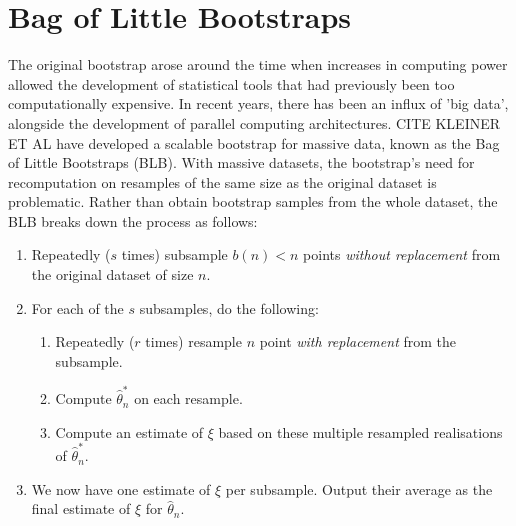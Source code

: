 \documentclass{article}\usepackage[]{graphicx}\usepackage[]{color}
\begin{document}


\section{Bag of Little Bootstraps}
The original bootstrap arose around the time when increases in computing power allowed the development of statistical tools that had previously been too computationally expensive. In recent years, there has been an influx of 'big data', alongside the development of parallel computing architectures. CITE KLEINER ET AL have developed a scalable bootstrap for massive data, known as the Bag of Little Bootstraps (BLB). With massive datasets, the bootstrap's need for recomputation on resamples of the same size as the original dataset is problematic. Rather than obtain bootstrap samples from the whole dataset, the BLB breaks down the process as follows:

\begin{enumerate}
\item Repeatedly ($s$ times) subsample $b(n) < n$ points \emph{without replacement} from the original dataset of size $n$.
\item For each of the $s$ subsamples, do the following:
\begin{enumerate}
\item Repeatedly ($r$ times) resample $n$ point \emph{with replacement} from the subsample.
\item Compute $\hat\theta_n^*$ on each resample.
\item Compute an estimate of $\xi$ based on these multiple resampled realisations of $\hat\theta_n^*$.
\end{enumerate}
\item We now have one estimate of $\xi$ per subsample. Output their average as the final estimate of $\xi$ for $\hat\theta_n$.
\end{enumerate}

\end{document}
